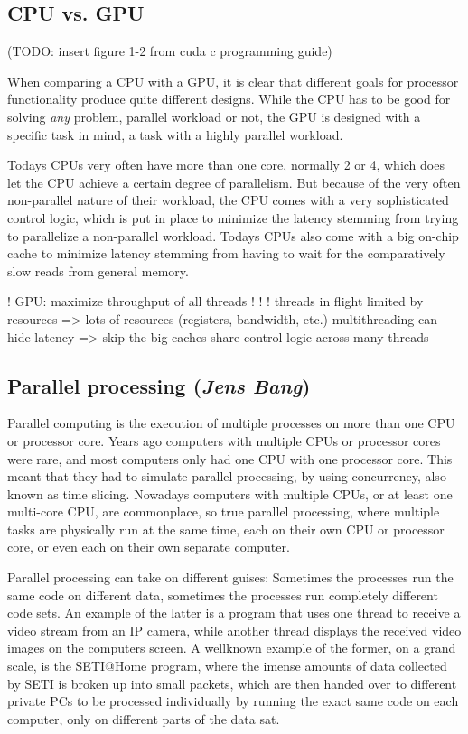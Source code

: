 \subsection{CPU vs. GPU}

(TODO: insert figure 1-2 from cuda c programming guide)

When comparing a CPU with a GPU, it is clear that different goals for processor functionality produce quite different designs. While the CPU has to be good for solving \emph{any} problem, parallel workload or not, the GPU is designed with a specific task in mind, a task with a highly parallel workload.

Todays CPUs very often have more than one core, normally 2 or 4, which does let the CPU achieve a certain degree of parallelism. But because of the very often non-parallel nature of their workload, the CPU comes with a very sophisticated control logic, which is put in place to minimize the latency stemming from trying to parallelize a non-parallel workload. Todays CPUs also come with a big on-chip cache to minimize latency stemming from having to wait for the comparatively slow reads from general memory.



!   GPU: maximize throughput of all threads
!  
!   !  
threads in flight limited by resources => lots of resources (registers, bandwidth, etc.)
multithreading can hide latency => skip the big caches share control logic across many threads

\subsection{Parallel processing (\textit{Jens Bang})}

Parallel computing is the execution of multiple processes on more than one CPU or processor core. Years ago computers with multiple CPUs or processor cores were rare, and most computers only had one CPU with one processor core. This meant that they had to simulate parallel processing, by using concurrency, also known as time slicing. Nowadays computers with multiple CPUs, or at least one multi-core CPU, are commonplace, so true parallel processing, where multiple tasks are physically run at the same time, each on their own CPU or processor core, or even each on their own separate computer.

Parallel processing can take on different guises: Sometimes the processes run the same code on different data, sometimes the processes run completely different code sets. An example of the latter is a program that uses one thread to receive a video stream from an IP camera, while another thread displays the received video images on the computers screen. A wellknown example of the former, on a grand scale, is the SETI@Home program, where the imense amounts of data collected by SETI is broken up into small packets, which are then handed over to different private PCs to be processed individually by running the exact same code on each computer, only on different parts of the data sat.

